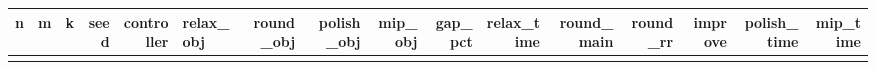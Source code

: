 \begin{tabular}{lrrrrlrrrrrrrrrr}
\hline
n & m & k & seed & controller & relax_obj & round_obj & polish_obj & mip_obj & gap_pct & relax_time & round_main & round_rr & improve & polish_time & mip_time \\ \hline
 &  &  &  &  &  &  &  &  &  &  &  &  &  &  &  \\
\hline
\end{tabular}
